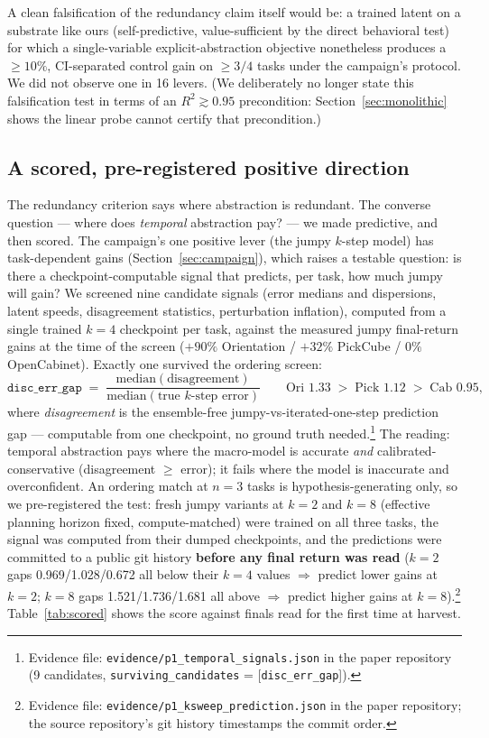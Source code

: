 \documentclass{article}
\begin{document}
A clean falsification of the redundancy claim itself would be: a trained latent on a substrate like ours (self-predictive, value-sufficient by the direct behavioral test) for which a single-variable explicit-abstraction objective nonetheless produces a $\geq 10\%$, CI-separated control gain on $\geq 3/4$ tasks under the campaign's protocol. We did not observe one in 16 levers. (We deliberately no longer state this falsification test in terms of an $R^2 \gtrsim 0.95$ precondition: Section~\ref{sec:monolithic} shows the linear probe cannot certify that precondition.)

\subsection{A scored, pre-registered positive direction}
\label{sec:scored}

The redundancy criterion says where abstraction is redundant. The converse question --- where does \emph{temporal} abstraction pay? --- we made predictive, and then scored. The campaign's one positive lever (the jumpy $k$-step model) has task-dependent gains (Section~\ref{sec:campaign}), which raises a testable question: is there a checkpoint-computable signal that predicts, per task, how much jumpy will gain? We screened nine candidate signals (error medians and dispersions, latent speeds, disagreement statistics, perturbation inflation), computed from a single trained $k{=}4$ checkpoint per task, against the measured jumpy final-return gains at the time of the screen ($+90\%$ Orientation / $+32\%$ PickCube / $0\%$ OpenCabinet). Exactly one survived the ordering screen:
\[
\texttt{disc\_err\_gap} \;=\; \frac{\mathrm{median}(\text{disagreement})}{\mathrm{median}(\text{true $k$-step error})}
\qquad \text{Ori } 1.33 \;>\; \text{Pick } 1.12 \;>\; \text{Cab } 0.95,
\]
where \emph{disagreement} is the ensemble-free jumpy-vs-iterated-one-step prediction gap --- computable from one checkpoint, no ground truth needed.\footnote{Evidence file: \texttt{evidence/p1\_temporal\_signals.json} in the paper repository (9 candidates, \texttt{surviving\_candidates} = [\texttt{disc\_err\_gap}]).} The reading: temporal abstraction pays where the macro-model is accurate \emph{and} calibrated-conservative (disagreement $\geq$ error); it fails where the model is inaccurate and overconfident. An ordering match at $n{=}3$ tasks is hypothesis-generating only, so we pre-registered the test: fresh jumpy variants at $k{=}2$ and $k{=}8$ (effective planning horizon fixed, compute-matched) were trained on all three tasks, the signal was computed from their dumped checkpoints, and the predictions were committed to a public git history \textbf{before any final return was read} ($k{=}2$ gaps 0.969/1.028/0.672 all below their $k{=}4$ values $\Rightarrow$ predict lower gains at $k{=}2$; $k{=}8$ gaps 1.521/1.736/1.681 all above $\Rightarrow$ predict higher gains at $k{=}8$).\footnote{Evidence file: \texttt{evidence/p1\_ksweep\_prediction.json} in the paper repository; the source repository's git history timestamps the commit order.} Table~\ref{tab:scored} shows the score against finals read for the first time at harvest.
\end{document}
